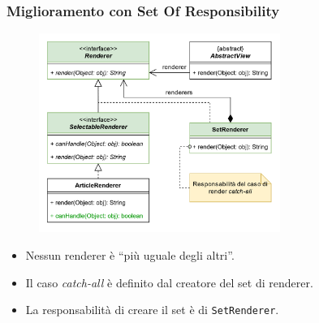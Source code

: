 \begin{frame}
    \frametitle{Miglioramento con Set Of Responsibility}

    \begin{figure}
        \includegraphics[width=0.7\textwidth]{img/setofresponsibility.png}
    \end{figure}
    \begin{itemize}
      \item Nessun renderer è ``più uguale degli altri''.
      \item Il caso \emph{catch-all} è definito dal creatore del set di renderer.
      \item La responsabilità di creare il set è di \texttt{SetRenderer}.
    \end{itemize}
\end{frame}

